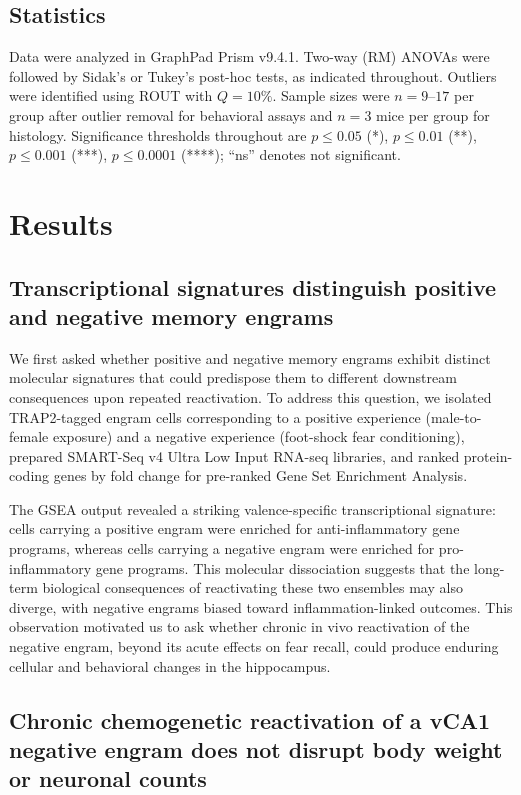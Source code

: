 \documentclass[11pt]{article}
\begin{document}
\subsection{Statistics}
Data were analyzed in GraphPad Prism v9.4.1. Two-way (RM) ANOVAs were followed by Sidak's or Tukey's post-hoc tests, as indicated throughout. Outliers were identified using ROUT with $Q=10\%$. Sample sizes were $n=9$--$17$ per group after outlier removal for behavioral assays and $n=3$ mice per group for histology. Significance thresholds throughout are $p \leq 0.05$ (*), $p \leq 0.01$ (**), $p \leq 0.001$ (***), $p \leq 0.0001$ (****); ``ns'' denotes not significant.

\section{Results}

\subsection{Transcriptional signatures distinguish positive and negative memory engrams}

We first asked whether positive and negative memory engrams exhibit distinct molecular signatures that could predispose them to different downstream consequences upon repeated reactivation. To address this question, we isolated TRAP2-tagged engram cells corresponding to a positive experience (male-to-female exposure) and a negative experience (foot-shock fear conditioning), prepared SMART-Seq v4 Ultra Low Input RNA-seq libraries, and ranked protein-coding genes by fold change for pre-ranked Gene Set Enrichment Analysis.

The GSEA output revealed a striking valence-specific transcriptional signature: cells carrying a positive engram were enriched for anti-inflammatory gene programs, whereas cells carrying a negative engram were enriched for pro-inflammatory gene programs. This molecular dissociation suggests that the long-term biological consequences of reactivating these two ensembles may also diverge, with negative engrams biased toward inflammation-linked outcomes. This observation motivated us to ask whether chronic in vivo reactivation of the negative engram, beyond its acute effects on fear recall, could produce enduring cellular and behavioral changes in the hippocampus.

\subsection{Chronic chemogenetic reactivation of a vCA1 negative engram does not disrupt body weight or neuronal counts}
\end{document}
